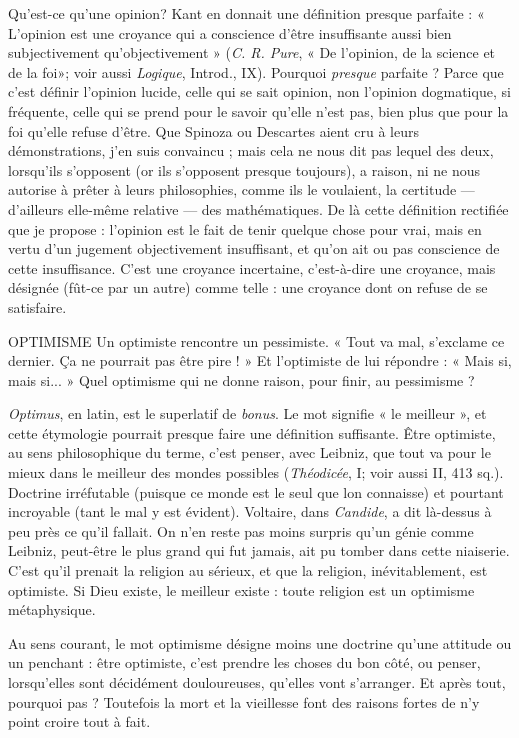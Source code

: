Qu'est-ce qu’une opinion? Kant en donnait une définition presque
parfaite : « L'opinion est une croyance qui a conscience d’être insuffisante aussi
bien subjectivement qu’objectivement » ({\it C. R. Pure}, « De l'opinion, de la
science et de la foi»; voir aussi {\it Logique}, Introd., IX). Pourquoi {\it presque}
parfaite ? Parce que c’est définir l’opinion lucide, celle qui se sait opinion, non
l'opinion dogmatique, si fréquente, celle qui se prend pour le savoir qu’elle
n'est pas, bien plus que pour la foi qu’elle refuse d’être. Que Spinoza ou Descartes
aient cru à leurs démonstrations, j’en suis convaincu ; mais cela ne nous
dit pas lequel des deux, lorsqu'ils s'opposent (or ils s'opposent presque toujours),
a raison, ni ne nous autorise à prêter à leurs philosophies, comme ils le
voulaient, la certitude — d’ailleurs elle-même relative — des mathématiques. De
là cette définition rectifiée que je propose : l’opinion est le fait de tenir quelque
chose pour vrai, mais en vertu d’un jugement objectivement insuffisant, et
qu’on ait ou pas conscience de cette insuffisance. C’est une croyance incertaine,
c’est-à-dire une croyance, mais désignée (fût-ce par un autre) comme telle : une
croyance dont on refuse de se satisfaire.

OPTIMISME Un optimiste rencontre un pessimiste. « Tout va mal, s’exclame
ce dernier. Ça ne pourrait pas être pire ! » Et l’optimiste
de lui répondre : « Mais si, mais si... » Quel optimisme qui ne donne raison,
pour finir, au pessimisme ?

{\it Optimus}, en latin, est le superlatif de {\it bonus}. Le mot signifie « le meilleur »,
et cette étymologie pourrait presque faire une définition suffisante. Être optimiste,
au sens philosophique du terme, c’est penser, avec Leibniz, que tout va
pour le mieux dans le meilleur des mondes possibles ({\it Théodicée}, I; voir aussi
II, 413 sq.). Doctrine irréfutable (puisque ce monde est le seul que lon
connaisse) et pourtant incroyable (tant le mal y est évident). Voltaire, dans
{\it Candide}, a dit là-dessus à peu près ce qu’il fallait. On n’en reste pas moins surpris
qu'un génie comme Leibniz, peut-être le plus grand qui fut jamais, ait pu
tomber dans cette niaiserie. C’est qu’il prenait la religion au sérieux, et que la
religion, inévitablement, est optimiste. Si Dieu existe, le meilleur existe : toute
religion est un optimisme métaphysique.

Au sens courant, le mot optimisme désigne moins une doctrine qu’une attitude
ou un penchant : être optimiste, c’est prendre les choses du bon côté, ou
penser, lorsqu’elles sont décidément douloureuses, qu’elles vont s'arranger. Et
après tout, pourquoi pas ? Toutefois la mort et la vieillesse font des raisons
fortes de n’y point croire tout à fait.

